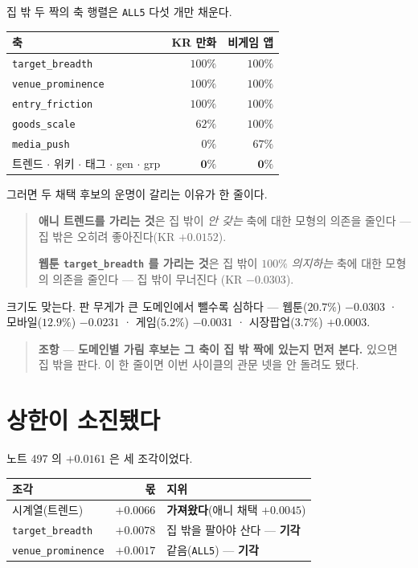 \documentclass[11pt]{article}
\begin{document}
집 밖 두 짝의 축 행렬은 \texttt{ALL5} 다섯 개만 채운다.

\begin{center}
\begin{tabular}{lrr}
\hline
축 & KR 만화 & 비게임 앱 \\
\hline
\texttt{target\_breadth} & $100\%$ & $100\%$ \\
\texttt{venue\_prominence} & $100\%$ & $100\%$ \\
\texttt{entry\_friction} & $100\%$ & $100\%$ \\
\texttt{goods\_scale} & $62\%$ & $100\%$ \\
\texttt{media\_push} & $0\%$ & $67\%$ \\
\hline
트렌드 $\cdot$ 위키 $\cdot$ 태그 $\cdot$ gen $\cdot$ grp & $\mathbf{0\%}$ & $\mathbf{0\%}$ \\
\hline
\end{tabular}
\end{center}

그러면 두 채택 후보의 운명이 갈리는 이유가 한 줄이다.

\begin{quote}
\textbf{애니 트렌드를 가리는 것}은 집 밖이 \emph{안 갖는} 축에 대한
모형의 의존을 줄인다 --- 집 밖은 오히려 좋아진다(KR $+0.0152$).

\textbf{웹툰 \texttt{target\_breadth} 를 가리는 것}은 집 밖이 $100\%$
\emph{의지하는} 축에 대한 모형의 의존을 줄인다 --- 집 밖이 무너진다
(KR $-0.0303$).
\end{quote}

크기도 맞는다. 판 무게가 큰 도메인에서 뺄수록 심하다 --- 웹툰($20.7\%$)
$-0.0303$ · 모바일($12.9\%$) $-0.0231$ · 게임($5.2\%$) $-0.0031$ ·
시장팝업($3.7\%$) $+0.0003$.

\begin{quote}
\textbf{조항} --- \textbf{도메인별 가림 후보는 그 축이 집 밖 짝에
있는지 먼저 본다.} 있으면 집 밖을 판다. 이 한 줄이면 이번 사이클의
관문 넷을 안 돌려도 됐다.
\end{quote}

\section{상한이 소진됐다}

노트 497 의 $+0.0161$ 은 세 조각이었다.

\begin{center}
\begin{tabular}{lrl}
\hline
조각 & 몫 & 지위 \\
\hline
시계열(트렌드) & $+0.0066$ & \textbf{가져왔다}(애니 채택 $+0.0045$) \\
\texttt{target\_breadth} & $+0.0078$ & 집 밖을 팔아야 산다 --- \textbf{기각} \\
\texttt{venue\_prominence} & $+0.0017$ & 같음(\texttt{ALL5}) --- \textbf{기각} \\
\hline
\end{tabular}
\end{center}
\end{document}
